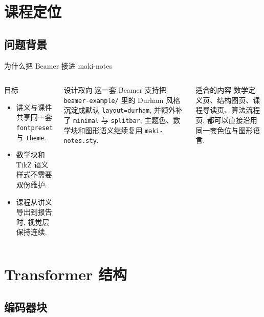 \documentclass[aspectratio=169,fontpreset=common,theme=cobalt,layout=splitbar]{maki-beamer}
\title{\LectureNotesTitle}
\subtitle{Transformer, PINN 与共享样式层}
\author{Maki Notes Demo}
\institute{maki-beamer / maki-notes}
\date{2026-04-13}
\begin{document}
\MakeTitlePage
\makeoutline[本次内容]

\section{课程定位}
\subsection{问题背景}

\begin{frame}[t]{为什么把 Beamer 接进 maki-notes}
  \small
  \begin{columns}[T,onlytextwidth]
    \begin{block}{目标}
      \begin{itemize}
        \item 讲义与课件共享同一套 \texttt{fontpreset} 与 \texttt{theme}.
        \item 数学块和 TikZ 语义样式不需要双份维护.
        \item 课程从讲义导出到报告时, 视觉层保持连续.
      \end{itemize}
    \end{block}

    \begin{alertblock}{设计取向}
      这一套 Beamer 支持把 \texttt{beamer-example/} 里的 Durham 风格沉淀成默认 \texttt{layout=durham}, 并额外补了 \texttt{minimal} 与 \texttt{splitbar}; 主题色、数学块和图形语义继续复用 \texttt{maki-notes.sty}.
    \end{alertblock}

    \begin{exampleblock}{适合的内容}
      数学定义页、结构图页、课程导读页、算法流程页, 都可以直接沿用同一套色位与图形语言.
    \end{exampleblock}
  \end{columns}
\end{frame}

\section{Transformer 结构}
\subsection{编码器块}
\end{document}
